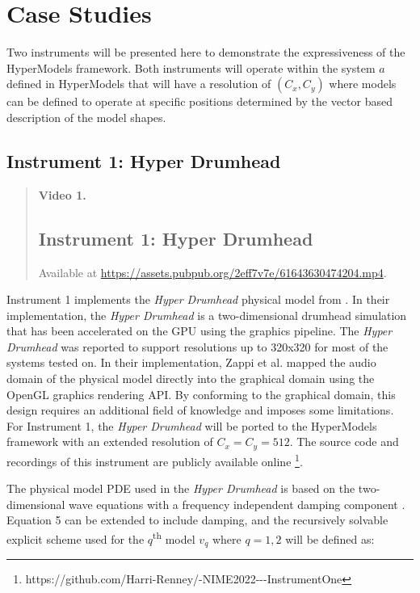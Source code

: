 \documentclass[sigconf]{nimeart}
\begin{document}
\section{Case Studies}\label{case-studies}

Two instruments will be presented here to demonstrate the expressiveness of the HyperModels framework. Both instruments will operate within the system $a$ defined in HyperModels that will have a resolution of $(C_x, C_y)$ where models can be defined to operate at specific positions determined by the vector based description of the model shapes.

\subsection{Instrument 1: Hyper Drumhead}\label{instrument-1-hyper-drumhead}


\begin{quote}\small\textbf{Video 1.} \subsection{Instrument 1: Hyper Drumhead}\label{instrument-one} Available at \url{https://assets.pubpub.org/2eff7v7e/61643630474204.mp4}.\end{quote}


Instrument 1 implements the \emph{Hyper Drumhead} physical model from \cite{Zappi2017Shader,Zappi2017hyper}. In their implementation, the \emph{Hyper Drumhead} is a two-dimensional drumhead simulation that has been accelerated on the GPU using the graphics pipeline. The \emph{Hyper Drumhead} was reported to support resolutions up to 320x320 for most of the systems tested on. In their implementation, Zappi et al. mapped the audio domain of the physical model directly into the graphical domain using the OpenGL graphics rendering API. By conforming to the graphical domain, this design requires an additional field of knowledge and imposes some limitations. For Instrument 1, the \emph{Hyper Drumhead} will be ported to the HyperModels framework with an extended resolution of $C_x = C_y = 512$. The source code and recordings of this instrument are publicly available online \footnote{https://github.com/Harri-Renney/-NIME2022-\/-\/-InstrumentOne}.

The physical model PDE used in the \emph{Hyper Drumhead} is based on the two-dimensional wave equations with a frequency independent damping component \cite{Renardy2006introduction}. Equation 5 can be extended to include damping, and the recursively solvable explicit scheme used for the $q$\textsuperscript{th} model $v_q$ where $q = 1, 2$ will be defined as:
\end{document}
